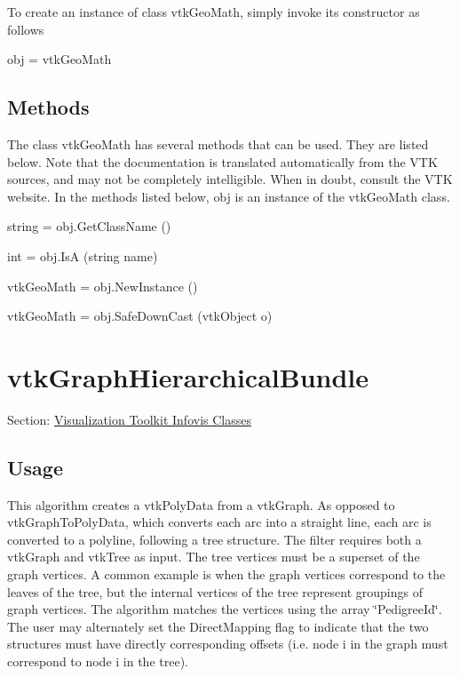 To create an instance of class vtk\-Geo\-Math, simply invoke its constructor as follows \begin{DoxyVerb}  obj = vtkGeoMath
\end{DoxyVerb}
 \hypertarget{vtkwidgets_vtkxyplotwidget_Methods}{}\subsection{Methods}\label{vtkwidgets_vtkxyplotwidget_Methods}
The class vtk\-Geo\-Math has several methods that can be used. They are listed below. Note that the documentation is translated automatically from the V\-T\-K sources, and may not be completely intelligible. When in doubt, consult the V\-T\-K website. In the methods listed below, {\ttfamily obj} is an instance of the vtk\-Geo\-Math class. 
\begin{DoxyItemize}
\item {\ttfamily string = obj.\-Get\-Class\-Name ()}  
\item {\ttfamily int = obj.\-Is\-A (string name)}  
\item {\ttfamily vtk\-Geo\-Math = obj.\-New\-Instance ()}  
\item {\ttfamily vtk\-Geo\-Math = obj.\-Safe\-Down\-Cast (vtk\-Object o)}  
\end{DoxyItemize}\hypertarget{vtkinfovis_vtkgraphhierarchicalbundle}{}\section{vtk\-Graph\-Hierarchical\-Bundle}\label{vtkinfovis_vtkgraphhierarchicalbundle}
Section\-: \hyperlink{sec_vtkinfovis}{Visualization Toolkit Infovis Classes} \hypertarget{vtkwidgets_vtkxyplotwidget_Usage}{}\subsection{Usage}\label{vtkwidgets_vtkxyplotwidget_Usage}
This algorithm creates a vtk\-Poly\-Data from a vtk\-Graph. As opposed to vtk\-Graph\-To\-Poly\-Data, which converts each arc into a straight line, each arc is converted to a polyline, following a tree structure. The filter requires both a vtk\-Graph and vtk\-Tree as input. The tree vertices must be a superset of the graph vertices. A common example is when the graph vertices correspond to the leaves of the tree, but the internal vertices of the tree represent groupings of graph vertices. The algorithm matches the vertices using the array \char`\"{}\-Pedigree\-Id\char`\"{}. The user may alternately set the Direct\-Mapping flag to indicate that the two structures must have directly corresponding offsets (i.\-e. node i in the graph must correspond to node i in the tree).

